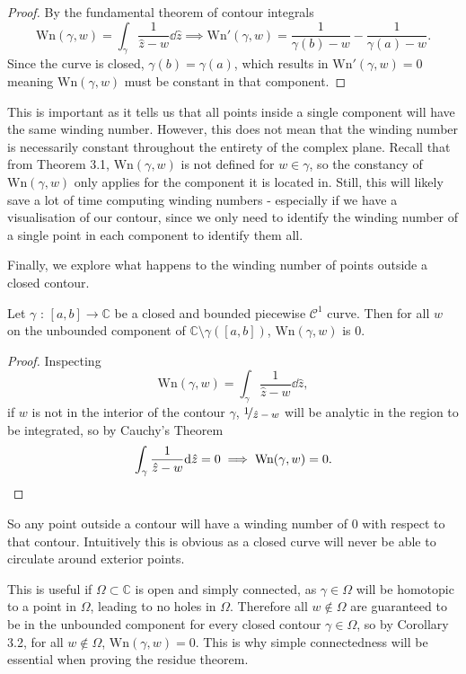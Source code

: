 \documentclass[a4paper]{article}
\def\nicefrac#1#2{%
    \raise.5ex\hbox{\begin{footnotesize}$#1$\end{footnotesize}}%
    \kern-.15em/\kern-.035em%
    \lower.25ex\hbox{\begin{footnotesize}$#2$\end{footnotesize}}}
\def\Wind{\text{Wn}}
\begin{document}
\begin{proof}
By the fundamental theorem of contour integrals
\[ \Wind (\gamma,w) = \int_\gamma { \frac{1}{\hat{z}-w} \dd \hat{z}} \implies \Wind '(\gamma,w) =   \frac{1}{\gamma(b)-w }-\frac{1}{\gamma(a)-w}.\]
Since the curve is closed, $\gamma(b)=\gamma(a)$, which results in $\Wind '(\gamma,w)=0$ meaning $\Wind (\gamma,w)$ must be constant in that component.
\end{proof}

This is important as it tells us that all points inside a single component will have the same winding number. However, this does not mean that the winding number is necessarily constant throughout the entirety of the complex plane. Recall that from Theorem 3.1, $\Wind (\gamma,w)$  is not defined for $w \in \gamma$, so the constancy of $\Wind (\gamma,w)$ only applies for the component it is located in. Still, this will likely save a lot of time computing winding numbers -  especially if we have a visualisation of our contour, since we only need to identify the winding number of a single point in each component to identify them all. 

Finally, we explore what happens to the winding number of points outside a closed contour.

\begin{corollary}{}{} \label{thm:unboundedwind}
Let $\gamma$ : $[a,b] \rightarrow \mathbb{C}$ be a closed and bounded piecewise $\mathcal{C}^{1}$ curve. Then for all $w$ on the unbounded component of $\mathbb{C} \setminus \gamma([a,b])$, $\Wind (\gamma, w)$ is $0$.
\end{corollary}

\begin{proof}
Inspecting
\[ \Wind(\gamma,w) = \int_\gamma { \frac{1}{\hat{z}-w} \dd \hat{z}},\]
if $w$ is not in the interior of the contour $\gamma$, $\nicefrac{1}{\hat{z}-w}$ will be analytic in the region to be integrated, so by Cauchy's Theorem
\[\int_\gamma { \frac{1}{\hat{z}-w} \dd \hat{z}} = 0 \implies \Wind (\gamma,w) = 0. \qedhere\]
\end{proof}

So any point outside a contour will have a winding number of 0 with respect to that contour. Intuitively this is obvious as a closed curve will never be able to circulate around exterior points. 
 

This is useful if $\Omega \subset \mathbb{C}$ is open and simply connected, as $\gamma \in \Omega$ will be homotopic to a point in $\Omega$, leading to no holes in $\Omega$. Therefore all $w \notin \Omega$ are guaranteed to be in the unbounded component for every closed contour $\gamma \in \Omega$, so by Corollary 3.2, for all $w \notin \Omega$, $\Wind(\gamma, w)=0$. This is why simple connectedness will be essential when proving the residue theorem.
\end{document}

